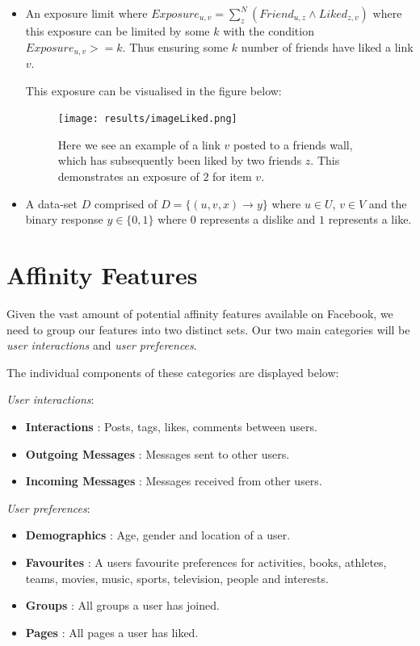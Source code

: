 \begin{itemize}
\item An exposure limit where $Exposure_{u,v} = \displaystyle\sum_{z}^{N} (Friend_{u,z} \wedge Liked_{z,v})$ where this exposure can be 
limited by some $k$ with the condition $Exposure_{u,v} >= k$. Thus ensuring some $k$ number of friends have liked a link $v$.

This exposure can be visualised in the figure below:

\begin{figure}[tbh!]
	\begin{center}
		\texttt{[image: results/imageLiked.png]}
		\caption{Here we see an example of a link $v$ posted to a friends wall, which has subsequently been liked by two friends $z$. This 
				 demonstrates an exposure of $2$ for item $v$.}
	\end{center}
\end{figure}

\item A data-set $D$ comprised of $D = \{(u,v,x) \to y\}$ where $u \in U$, $v \in V$ and the binary response $y \in \{0,1\}$ 
where $0$ represents a dislike and $1$ represents a like. 
\end{itemize}

\section{Affinity Features}
\label{sec:features}

Given the vast amount of potential affinity features available on Facebook, we need to group our features into two 
distinct sets. Our two main categories will be \emph{user interactions} and \emph{user preferences}.

The individual components of these categories are displayed below:

\emph{User interactions}:
\begin{itemize}
\item \textbf{Interactions} : Posts, tags, likes, comments between users.
\item \textbf{Outgoing Messages} : Messages sent to other users.
\item \textbf{Incoming Messages} : Messages received from other users.
\end{itemize}

\emph{User preferences}:
\begin{itemize}
\item \textbf{Demographics} : Age, gender and location of a user.
\item \textbf{Favourites} : A users favourite preferences for activities, books, athletes, teams, movies, music, sports, television, people and interests.
\item \textbf{Groups} : All groups a user has joined.
\item \textbf{Pages} :  All pages a user has liked.
\end{itemize}

